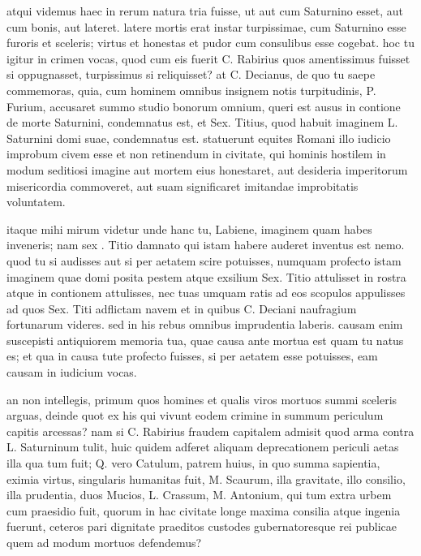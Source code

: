  atqui videmus haec in rerum natura tria fuisse, ut aut cum Saturnino esset, aut cum bonis, aut lateret. latere mortis erat instar turpissimae, cum Saturnino esse furoris et sceleris; virtus et honestas et pudor cum consulibus esse cogebat. hoc tu igitur in crimen vocas, quod cum eis fuerit C. Rabirius quos amentissimus fuisset si oppugnasset, turpissimus si reliquisset? at C. Decianus, de quo tu saepe commemoras, quia, cum hominem omnibus insignem notis turpitudinis, P. Furium, accusaret summo studio bonorum omnium, queri est ausus in contione de morte Saturnini, condemnatus est, et Sex. Titius, quod habuit imaginem L. Saturnini domi suae, condemnatus est. statuerunt equites Romani illo iudicio improbum civem esse et non retinendum in civitate, qui hominis hostilem in modum seditiosi imagine aut mortem eius honestaret, aut desideria imperitorum misericordia commoveret, aut suam significaret imitandae improbitatis voluntatem.

 itaque mihi mirum videtur unde hanc tu, Labiene, imaginem quam habes inveneris; nam sex . Titio damnato qui istam habere auderet inventus est nemo. quod tu si audisses aut si per aetatem scire potuisses, numquam profecto istam imaginem quae domi posita pestem atque exsilium Sex. Titio attulisset in rostra atque in contionem attulisses, nec tuas umquam ratis ad eos scopulos appulisses ad quos Sex. Titi adflictam navem et in quibus C. Deciani naufragium fortunarum videres. sed in his rebus omnibus imprudentia laberis. causam enim suscepisti antiquiorem memoria tua, quae causa ante mortua est quam tu natus es; et qua in causa tute profecto fuisses, si per aetatem esse potuisses, eam causam in iudicium vocas.

 an non intellegis, primum quos homines et qualis viros mortuos summi sceleris arguas, deinde quot ex his qui vivunt eodem crimine in summum periculum capitis arcessas? nam si C. Rabirius fraudem capitalem admisit quod arma contra L. Saturninum tulit, huic quidem adferet aliquam deprecationem periculi aetas illa qua tum fuit; Q. vero Catulum, patrem huius, in quo summa sapientia, eximia virtus, singularis humanitas fuit, M. Scaurum, illa gravitate, illo consilio, illa prudentia, duos Mucios, L. Crassum, M. Antonium, qui tum extra urbem cum praesidio fuit, quorum in hac civitate longe maxima consilia atque ingenia fuerunt, ceteros pari dignitate praeditos custodes gubernatoresque rei publicae quem ad modum mortuos defendemus?

